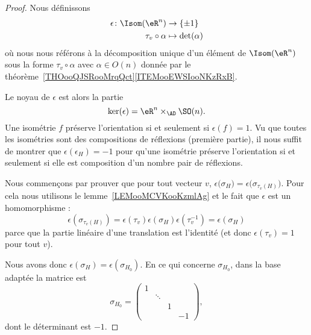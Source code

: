 \begin{proof}
    Nous définissons
    \begin{equation}
        \begin{aligned}
            \epsilon\colon \Isom(\eR^n)&\to \{ \pm 1 \} \\
            \tau_v\circ \alpha&\mapsto \det(\alpha)
        \end{aligned}
    \end{equation}
    où nous nous référons à la décomposition unique d'un élément de \( \Isom(\eR^n)\) sous la forme \( \tau_v\circ \alpha\) avec \( \alpha\in O(n)\) donnée par le théorème~\ref{THOooQJSRooMrqQct}\ref{ITEMooEWSIooNKzRxB}.

    Le noyau de \( \epsilon\) est alors la partie
    \begin{equation}
        \ker(\epsilon)=\eR^n\times_{\AD}\SO(n).
    \end{equation}
    Une isométrie \( f\) préserve l'orientation si et seulement si \( \epsilon(f)=1\). Vu que toutes les isométries sont des compositions de réflexions (première partie), il nous suffit de montrer que \( \epsilon(\epsilon_H)=-1\) pour qu'une isométrie préserve l'orientation si et seulement si elle est composition d'un nombre pair de réflexions.

    Nous commençons par prouver que pour tout vecteur \( v\), \( \epsilon\big( \sigma_H \big)=\epsilon\big( \sigma_{\tau_v(H)} \big)\). Pour cela nous utilisons le lemme~\ref{LEMooMCVKooKzmlAg} et le fait que \( \epsilon\) est un homomorphisme :
    \begin{equation}
        \epsilon(\sigma_{\tau_v(H)})=\epsilon(\tau_v)\epsilon(\sigma_H)\epsilon(\tau_v^{-1})=\epsilon(\sigma_H)
    \end{equation}
    parce que la partie linéaire d'une translation est l'identité (et donc \( \epsilon(\tau_v)=1\) pour tout \( v\)).

    Nous avons donc \( \epsilon(\sigma_H)=\epsilon(\sigma_{H_0})\). En ce qui concerne \( \sigma_{H_0}\), dans la base adaptée la matrice est
    \begin{equation}
        \sigma_{H_0}=\begin{pmatrix}
             1   &       &       &       \\
                &   \ddots    &       &       \\
                &       &   1    &       \\
                &       &       &   -1
         \end{pmatrix},
    \end{equation}
    dont le déterminant est \( -1\).
\end{proof}

